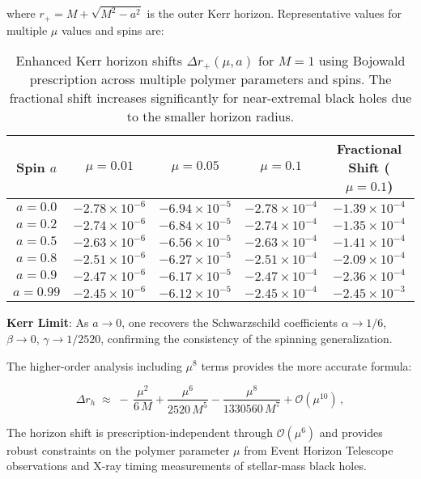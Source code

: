 \documentclass[11pt]{article}
\begin{document}
where $r_+ = M + \sqrt{M^2 - a^2}$ is the outer Kerr horizon. Representative values for multiple $\mu$ values and spins are:

\begin{table}[h]
\centering
\begin{tabular}{|c|c|c|c|c|}
\hline
\textbf{Spin $a$} & \textbf{$\mu=0.01$} & \textbf{$\mu=0.05$} & \textbf{$\mu=0.1$} & \textbf{Fractional Shift ($\mu=0.1$)} \\
\hline
$a=0.0$ & $-2.78 \times 10^{-6}$ & $-6.94 \times 10^{-5}$ & $-2.78 \times 10^{-4}$ & $-1.39 \times 10^{-4}$ \\
$a=0.2$ & $-2.74 \times 10^{-6}$ & $-6.84 \times 10^{-5}$ & $-2.74 \times 10^{-4}$ & $-1.35 \times 10^{-4}$ \\
$a=0.5$ & $-2.63 \times 10^{-6}$ & $-6.56 \times 10^{-5}$ & $-2.63 \times 10^{-4}$ & $-1.41 \times 10^{-4}$ \\
$a=0.8$ & $-2.51 \times 10^{-6}$ & $-6.27 \times 10^{-5}$ & $-2.51 \times 10^{-4}$ & $-2.09 \times 10^{-4}$ \\
$a=0.9$ & $-2.47 \times 10^{-6}$ & $-6.17 \times 10^{-5}$ & $-2.47 \times 10^{-4}$ & $-2.36 \times 10^{-4}$ \\
$a=0.99$ & $-2.45 \times 10^{-6}$ & $-6.12 \times 10^{-5}$ & $-2.45 \times 10^{-4}$ & $-2.45 \times 10^{-3}$ \\
\hline
\end{tabular}
\caption{Enhanced Kerr horizon shifts $\Delta r_+(\mu,a)$ for $M=1$ using Bojowald prescription across multiple polymer parameters and spins. The fractional shift increases significantly for near-extremal black holes due to the smaller horizon radius.}
\end{table}

\textbf{Kerr Limit}: As $a \to 0$, one recovers the Schwarzschild coefficients $\alpha \to 1/6$, $\beta \to 0$, $\gamma \to 1/2520$, confirming the consistency of the spinning generalization.

The higher-order analysis including $\mu^8$ terms provides the more accurate formula:

\begin{equation}
\Delta r_h \;\approx\; -\,\frac{\mu^2}{6\,M} + \frac{\mu^6}{2520\,M^5} - \frac{\mu^8}{1330560\,M^7} + \mathcal{O}(\mu^{10})\,,
\end{equation}

The horizon shift is prescription-independent through $\mathcal{O}(\mu^6)$ and provides robust constraints on the polymer parameter $\mu$ from Event Horizon Telescope observations and X-ray timing measurements of stellar-mass black holes.
\end{document}
